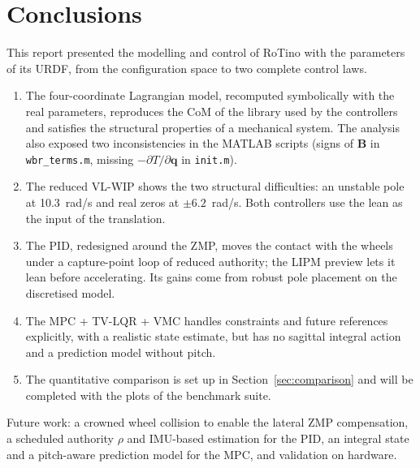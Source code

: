 \documentclass[11pt,a4paper]{article}
\newcommand{\bq}{\bm{q}}
\newcommand{\bB}{\bm{B}}
\begin{document}
\section{Conclusions}
\label{sec:conclusions}

This report presented the modelling and control of RoTino with the parameters of its URDF, from
the configuration space to two complete control laws.

\begin{enumerate}
    \item The four-coordinate Lagrangian model, recomputed symbolically with the real parameters,
          reproduces the CoM of the library used by the controllers and satisfies the structural
          properties of a mechanical system.  The analysis also exposed two inconsistencies in
          the MATLAB scripts (signs of $\bB$ in \texttt{wbr\_terms.m}, missing $-\partial T/\partial\bq$
          in \texttt{init.m}).
    \item The reduced VL-WIP shows the two structural difficulties: an unstable pole at
          10.3~rad/s and real zeros at $\pm6.2$~rad/s.  Both controllers use the lean as the input
          of the translation.
    \item The PID, redesigned around the ZMP, moves the contact with the wheels under a
          capture-point loop of reduced authority; the LIPM preview lets it lean before
          accelerating.  Its gains come from robust pole placement on the discretised model.
    \item The MPC + TV-LQR + VMC handles constraints and future references explicitly, with a
          realistic state estimate, but has no sagittal integral action and a prediction model
          without pitch.
    \item The quantitative comparison is set up in Section~\ref{sec:comparison} and will be
          completed with the plots of the benchmark suite.
\end{enumerate}

Future work: a crowned wheel collision to enable the lateral ZMP compensation, a scheduled
authority $\rho$ and IMU-based estimation for the PID, an integral state and a pitch-aware
prediction model for the MPC, and validation on hardware.
\end{document}
